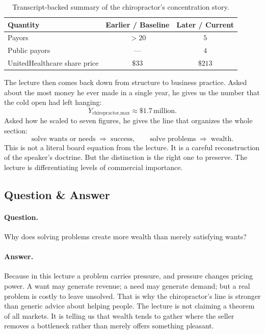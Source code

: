\begin{table}[h]
\centering
\begin{tabular}{lcc}
\hline
Quantity & Earlier / Baseline & Later / Current \\
\hline
Payors & \(>20\) & \(5\) \\
Public payors & --- & \(4\) \\
UnitedHealthcare share price & \(\$33\) & \(\$213\) \\
\hline
\end{tabular}
\caption{Transcript-backed summary of the chiropractor's concentration story.}
\end{table}

The lecture then comes back down from structure to business practice. Asked about the most money he ever made in a single year, he gives us the number that the cold open had left hanging:
\begin{equation}
Y_{\text{chiropractor,max}} \approx \$1.7\,\text{million}.
\end{equation}
Asked how he scaled to seven figures, he gives the line that organizes the whole section:
\begin{equation}
\text{solve wants or needs} \;\Rightarrow\; \text{success},
\qquad
\text{solve problems} \;\Rightarrow\; \text{wealth}.
\end{equation}
This is not a literal board equation from the lecture. It is a careful reconstruction of the speaker's doctrine. But the distinction is the right one to preserve. The lecture is differentiating levels of commercial importance.

\subsection{Question \& Answer}

\paragraph{Question.} Why does solving problems create more wealth than merely satisfying wants?

\paragraph{Answer.} Because in this lecture a problem carries pressure, and pressure changes pricing power. A want may generate revenue; a need may generate demand; but a real problem is costly to leave unsolved. That is why the chiropractor's line is stronger than generic advice about helping people. The lecture is not claiming a theorem of all markets. It is telling us that wealth tends to gather where the seller removes a bottleneck rather than merely offers something pleasant.

